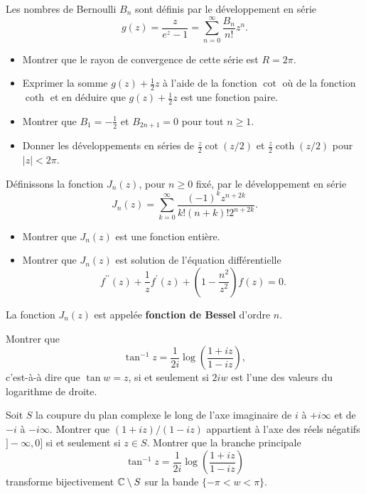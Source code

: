 \begin{exer}
Les nombres de Bernoulli $B_n$ sont définis par le développement en série
\[g(z)=\frac{z}{e^z -1} = \sum_{n=0}^\infty \frac{B_n}{n!} z^n.\]
\begin{itemize}
\item Montrer que le rayon de convergence de cette série est $R=2 \pi$.
\item Exprimer la somme $g(z) + \frac{1}{2}z$ à l'aide de la fonction $\cot$ où de la fonction $\coth$ et en déduire que $g(z)+\frac{1}{2}z$ est une fonction paire.
\item Montrer que $B_1=-\frac{1}{2}$ et $B_{2n+1} =0$ pour tout $n\geq 1$.
\item Donner les développements en séries de $\frac{z}{2}\cot(z/2)$ et $\frac{z}{2}\coth(z/2)$ pour $\lvert z \rvert < 2 \pi$.
\end{itemize}
\end{exer}

\begin{exer}
Définissons la fonction $J_n(z)$, pour $n \geq 0$ fixé, par le développement en série
\[J_n(z)=\sum_{k=0}^\infty \frac{(-1)^k z^{n+2 k}}{k!(n+k)! 2^{n+2k}}.\]
\begin{itemize}
\item Montrer que $J_n(z)$ est une fonction entière.
\item Montrer que $J_n(z)$ est solution de l'équation différentielle
\[f^{\prime \prime}(z) + \frac{1}{z}f^\prime (z) + \left(1-\frac{n^2}{z^2}\right) f(z)=0.\]
\end{itemize}
La fonction $J_n(z)$ est appelée \textbf{fonction de Bessel} d'ordre $n$.
\end{exer}

\begin{exer}
Montrer que 
\[\tan^{-1} z= \frac{1}{2 i} \log \left(\frac{1 + i z}{1-iz}\right),\]
c'est-à-à dire que $\tan w=z$, si et seulement si $2 i w$ est l'une des valeurs du logarithme de droite.
\end{exer}

\begin{exer}
Soit $S$ la coupure du plan complexe le long de l'axe imaginaire de $i$ à $+i\infty$ et de $-i$ à $-i \infty$. Montrer que $(1+iz)/(1-iz)$ appartient à l'axe des réels négatifs $]-\infty, 0]$ si et seulement si $z \in S$. Montrer que la branche principale 
\[\tan^{-1} z= \frac{1}{2 i} \log \left(\frac{1 + i z}{1-iz}\right)\]
transforme bijectivement $\mathbb{C} \setminus S$ sur la bande $\{-\pi < w <\pi \}$.
\end{exer}

